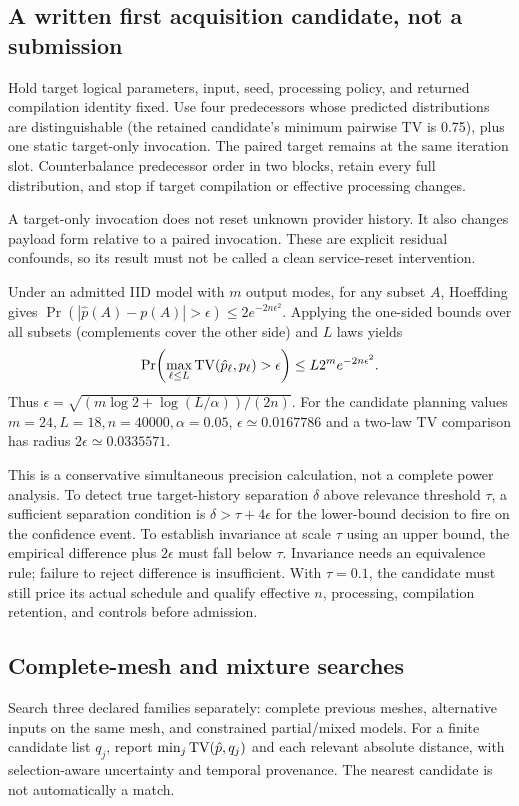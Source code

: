 \documentclass[11pt,a4paper]{article}
\begin{document}
\subsection{A written first acquisition candidate, not a submission}
Hold target logical parameters, input, seed, processing policy, and returned compilation identity fixed. Use four predecessors whose predicted distributions are distinguishable (the retained candidate's minimum pairwise TV is 0.75), plus one static target-only invocation. The paired target remains at the same iteration slot. Counterbalance predecessor order in two blocks, retain every full distribution, and stop if target compilation or effective processing changes.

A target-only invocation does not reset unknown provider history. It also changes payload form relative to a paired invocation. These are explicit residual confounds, so its result must not be called a clean service-reset intervention.

Under an admitted IID model with $m$ output modes, for any subset $A$, Hoeffding gives
$\Pr(|\hat p(A)-p(A)|>\epsilon)\le2e^{-2n\epsilon^2}$. Applying the one-sided bounds over all subsets (complements cover the other side) and $L$ laws yields
\begin{equation}\label{eq:eps}
\Pr\!\left(\max_{\ell\le L}\operatorname{TV}(\hat p_\ell,p_\ell)>\epsilon\right)
\le L2^m e^{-2n\epsilon^2}.
\end{equation}
Thus $\epsilon=\sqrt{(m\log2+\log(L/\alpha))/(2n)}$. For the candidate planning values $m=24,L=18,n=40000,\alpha=0.05$, $\epsilon\simeq0.0167786$ and a two-law TV comparison has radius $2\epsilon\simeq0.0335571$.

This is a conservative simultaneous precision calculation, not a complete power analysis. To detect true target-history separation $\delta$ above relevance threshold $\tau$, a sufficient separation condition is $\delta>\tau+4\epsilon$ for the lower-bound decision to fire on the confidence event. To establish invariance at scale $\tau$ using an upper bound, the empirical difference plus $2\epsilon$ must fall below $\tau$. Invariance needs an equivalence rule; failure to reject difference is insufficient. With $\tau=0.1$, the candidate must still price its actual schedule and qualify effective $n$, processing, compilation retention, and controls before admission.

\subsection{Complete-mesh and mixture searches}
Search three declared families separately: complete previous meshes, alternative inputs on the same mesh, and constrained partial/mixed models. For a finite candidate list $q_j$, report $\min_j\operatorname{TV}(\hat p,q_j)$ and each relevant absolute distance, with selection-aware uncertainty and temporal provenance. The nearest candidate is not automatically a match.
\end{document}
